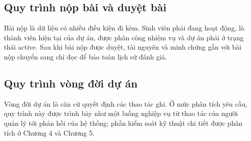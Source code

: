 \figAddStudentWorkflow

\subsection{Quy trình nộp bài và duyệt bài}

Bài nộp là dữ liệu có nhiều điều kiện đi kèm. Sinh viên phải đang hoạt động, là thành viên hiện tại của dự án, được phân công nhiệm vụ và dự án phải ở trạng thái active. Sau khi bài nộp được duyệt, tài nguyên và minh chứng gắn với bài nộp chuyển sang chỉ đọc để bảo toàn lịch sử đánh giá.

\figReviewWorkflow

\subsection{Quy trình vòng đời dự án}

Vòng đời dự án là căn cứ quyết định các thao tác ghi. Ở mức phân tích yêu cầu, quy trình này được trình bày như một luồng nghiệp vụ từ thao tác của người quản lý tới phản hồi của hệ thống; phần kiểm soát kỹ thuật chi tiết được phân tích ở Chương 4 và Chương 5.

\figProjectLifecycleWorkflow

